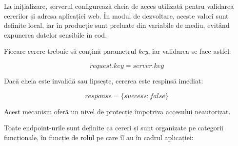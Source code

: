 La inițializare, serverul configurează cheia de acces utilizată pentru validarea cererilor și adresa aplicației web. În modul de dezvoltare, aceste valori sunt definite local, iar în producție sunt preluate din variabile de mediu, evitând expunerea datelor sensibile în cod.

Fiecare cerere trebuie să conțină parametrul \textit{key}, iar validarea se face astfel:

\[
    request.key = server.key
\]

Dacă cheia este invalidă sau lipsește, cererea este respinsă imediat:

\[
    response = \{success: false\}
\]

Acest mecanism oferă un nivel de protecție împotriva accesului neautorizat.

Toate endpoint-urile sunt definite ca cereri și sunt organizate pe categorii funcționale, în funcție de rolul pe care îl au în cadrul aplicației:

